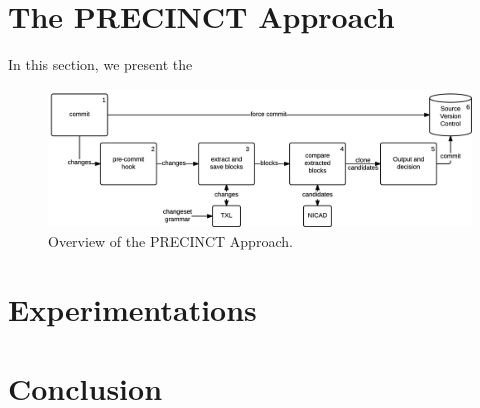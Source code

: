\documentclass[conference]{IEEEtran}
\begin{document}
\section{The PRECINCT Approach}
\label{sec:The PRECINCT Approach}

In this section, we present the

\begin{figure}
  \centering
    \includegraphics[width=\textwidth]{media/approach.png}
    \caption{ Overview of the PRECINCT Approach.\label{fig:precinct-approach}}
\end{figure}

\section{Experimentations}
\label{sec:Experimentations}

\section{Conclusion}
\label{sec:Conclusion}









\end{document}
